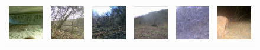 \begin{figure}[htp!]
\begin{tabularx}{.7\textwidth}{Y Y Y !{\space} Y Y Y}
        \includegraphics{gfx/unconditional-diffusion-sampling-caltech-qual/rgb_5860ef9d-23d2-11e8-a6a3-ec086b02610b.jpg} & \includegraphics{gfx/unconditional-diffusion-sampling-caltech-qual/rgb_58629181-23d2-11e8-a6a3-ec086b02610b.jpg} & \includegraphics{gfx/unconditional-diffusion-sampling-caltech-qual/rgb_58629415-23d2-11e8-a6a3-ec086b02610b.jpg} & \includegraphics{gfx/unconditional-diffusion-sampling-caltech-qual/diffusion_00008.png} & \includegraphics{gfx/unconditional-diffusion-sampling-caltech-qual/diffusion_00007.png} & \includegraphics{gfx/unconditional-diffusion-sampling-caltech-qual/diffusion_00006.png}

\end{tabularx}
\end{figure}
